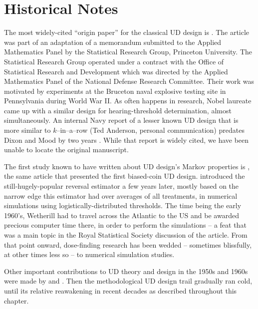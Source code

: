 \chapter{Historical Notes}\label{sec:history}

The most widely-cited ``origin paper'' for the classical UD design is \cite{Dixo:Mood:Amet:1948}. The article was part of an adaptation of a memorandum submitted to the Applied Mathematics Panel by the Statistical Research Group, Princeton University.  The Statistical Research Group operated under a contract with the Office of Statistical Research and Development which was directed by the Applied Mathematics Panel of the National Defense Research Committee.  Their work was motivated by experiments at the Bruceton naval explosive testing site in Pennsylvania during World War II. As often happens in research, Nobel laureate \cite{vonB:anew:1947} came up with a similar design for hearing-threshold determination, almost simultaneously.  An internal Navy report of a lesser known UD design that is more similar to $k$--in--a--row (Ted Anderson, personal communication) predates Dixon and Mood by two years  \citep{Ande:McCa:Tuke:Stai:1946}. While that report is widely cited, we have been unable to locate the original manuscript.

The first study known to have written about UD design's Markov properties is \cite{Derm:Nonp:1957}, the same article that presented the first biased-coin UD design. \cite{Weth:Chen:Vasu:est:1966} introduced the still-hugely-popular reversal estimator a few years later, mostly based on the narrow edge this estimator had over averages of all treatments, in numerical simulations using logistically-distributed thresholds. The time being the early 1960's, Wetherill had to travel across the Atlantic to the US and be awarded precious computer time there, in order to perform the simulations -- a feat that was a main topic in the Royal Statistical Society discussion of the \cite{Weth:Sequ:1963} article. From that point onward, dose-finding research has been wedded -- sometimes blissfully, at other times less so -- to numerical simulation studies.

Other important contributions to UD theory and design in the 1950s and 1960s were made by \cite{BrownleeEtAl53} and \cite{Tsut:asym:1967,Tsut:rand:1967}. Then the methodological UD design trail gradually ran cold, until its relative reawakening in recent decades as described throughout this chapter.
